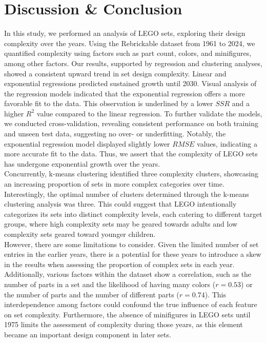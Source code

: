 \documentclass{article}
\theoremstyle{plain}
\theoremstyle{definition}
\theoremstyle{remark}
\begin{document}
	\section{Discussion \& Conclusion}\label{sec:conclusion}
	
	In this study, we performed an analysis of LEGO sets, exploring their design complexity over the years. Using the Rebrickable dataset from 1961 to 2024, we quantified complexity using factors such as part count, colors, and minifigures, among other factors. Our results, supported by regression and clustering analyses, showed a consistent upward trend in set design complexity. Linear and exponential regressions predicted sustained growth until 2030. Visual analysis of the regression models indicated that the exponential regression offers a more favorable fit to the data. This observation is underlined by a lower $SSR$ and a higher $R^2$ value compared to the linear regression. To further validate the models, we conducted cross-validation, revealing consistent performance on both training and unseen test data, suggesting no over- or underfitting. Notably, the exponential regression model displayed slightly lower $RMSE$ values, indicating a more accurate fit to the data. Thus, we assert that the complexity of LEGO sets has undergone exponential growth over the years. \\
	Concurrently, k-means clustering identified three complexity clusters, showcasing an increasing proportion of sets in more complex categories over time. Interestingly, the optimal number of clusters determined through the k-means clustering analysis was three. This could suggest that LEGO intentionally categorizes its sets into distinct complexity levels, each catering to different target groups, where high complexity sets may be geared towards adults and low complexity sets geared toward younger children.\\
	However, there are some limitations to consider. Given the limited number of set entries in the earlier years, there is a potential for these years to introduce a skew in the results when assessing the proportion of complex sets in each year. Additionally, various factors within the dataset show a correlation, such as the number of parts in a set and the likelihood of having many colors ($r=0.53$) or the number of parts and the number of different parts ($r=0.74$). This interdependence among factors could confound the true influence of each feature on set complexity. Furthermore, the absence of minifigures in LEGO sets until 1975 limits the assessment of complexity during those years, as this element became an important design component in later sets.
\end{document}
